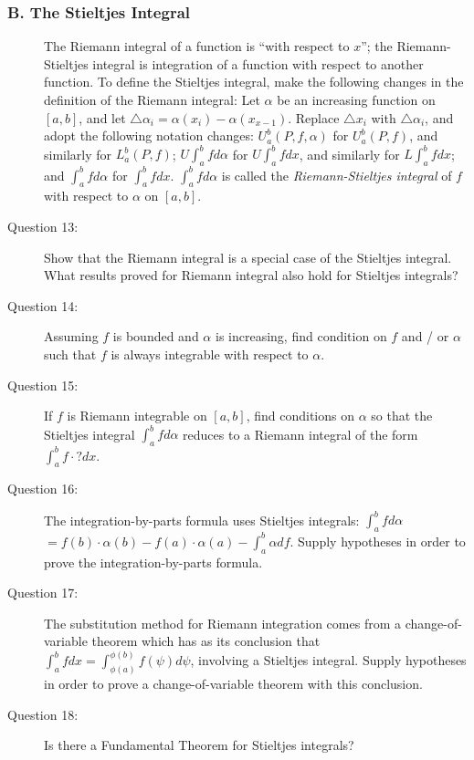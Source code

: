 \documentclass{article}
\begin{document}
\subsubsection*{B. The Stieltjes Integral}

\begin{description}

  \item[] The Riemann integral of a function is ``with respect to $x$''; the Riemann-Stieltjes integral is integration of a function with respect to another function. To define the Stieltjes integral, make the following changes in the definition of the Riemann integral: Let $\alpha$ be an increasing function on $[a,b]$, and let $\triangle \alpha_i = \alpha(x_i) - \alpha(x_{x-1})$. Replace $\triangle x_i$ with $\triangle \alpha_i$, and adopt the following notation changes: $U_a^b (P,f,\alpha)$ for $U_a^b (P,f)$, and similarly for $L_a^b (P,f)$; $U \int_a^b f d \alpha$ for $U\int_a^b f dx$, and similarly for $L \int_a^b f dx$; and $\int_a^b f d \alpha$ for $\int_a^b f dx$. $\int_a^b f d \alpha$ is called the \emph{Riemann-Stieltjes integral} of $f$ with respect to $\alpha$ on $[a,b]$.

  \item[Question 13:] Show that the Riemann integral is a special case of the Stieltjes integral. What results proved for Riemann integral also hold for Stieltjes integrals?

  \item[Question 14:] Assuming $f$ is bounded and $\alpha$ is increasing, find condition on $f$ and / or $\alpha$ such that $f$ is always integrable with respect to $\alpha$.

  \item[Question 15:] If $f$ is Riemann integrable on $[a,b]$, find conditions on $\alpha$ so that the Stieltjes integral $\int_a^b f d \alpha$ reduces to a Riemann integral of the form $\int_a^b f \cdot ? dx$.

  \item[Question 16:] The integration-by-parts formula uses Stieltjes integrals: $\int_a^b f d \alpha$ $= f(b) \cdot \alpha(b) - f(a) \cdot \alpha(a) - \int_a^b \alpha d f$. Supply hypotheses in order to prove the integration-by-parts formula.

  \item[Question 17:] The substitution method for Riemann integration comes from a change-of-variable theorem which has as its conclusion that $\int_a^b f dx = \int_{\phi(a)}^{\phi(b)} f(\psi) d\psi$, involving a Stieltjes integral. Supply hypotheses in order to prove a change-of-variable theorem with this conclusion.

  \item[Question 18:] Is there a Fundamental Theorem for Stieltjes integrals?

\end{description}
\end{document}
